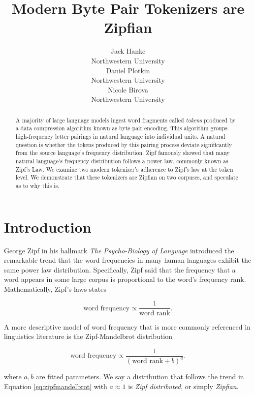 \documentclass[11pt]{article}
\title{Modern Byte Pair Tokenizers are Zipfian}
\author{Jack Hanke \\
  Northwestern University \\
  \And
  Daniel Plotkin \\
  Northwestern University \\
  \And
  Nicole Birova \\
  Northwestern University}
\begin{document}
\maketitle
\begin{abstract}
A majority of large language models ingest word fragments called \textit{tokens} produced by a data compression algorithm known as byte pair encoding. This algorithm groups high-frequency letter pairings in natural language into individual units. A natural question is whether the tokens produced by this pairing process deviate significantly from the source language's frequency distribution. Zipf famously showed that many natural language's frequency distribution follows a power law, commonly known as Zipf's Law. We examine two modern tokenizer's adherence to Zipf's law at the token level. We demonstrate that these tokenizers are Zipfian on two corpuses, and speculate as to why this is.
\end{abstract}

\section{Introduction}

George Zipf in his hallmark \textit{The Psycho-Biology of Language} \cite{Zip35} introduced the remarkable trend that the word frequencies in many human languages exhibit the same power law distribution. Specifically, Zipf said that the frequency  that a word appears in some large corpus is proportional to the word's frequency rank. Mathematically, Zipf's laws states

\begin{equation}
    \mbox{word frequency} \propto \frac{1}{\mbox{word rank}}.
\end{equation}

A more descriptive model of word frequency that is more commonly referenced in linguistics literature is the Zipf-Mandelbrot distribution

\begin{equation}
    \mbox{word frequency} \propto \frac{1}{(\mbox{word rank} + b)^a}.
    \label{eq:zipfmandelbrot}
\end{equation}

where $a,b$ are fitted parameters. We say a distribution that follows the trend in Equation \ref{eq:zipfmandelbrot} with $a \approx 1$ is \textit{Zipf distributed}, or simply \textit{Zipfian}.
\end{document}
